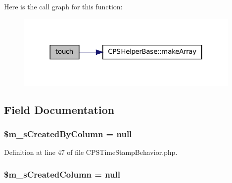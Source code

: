 Here is the call graph for this function:\nopagebreak
\begin{figure}[H]
\begin{center}
\leavevmode
\includegraphics[width=310pt]{classCPSTimeStampBehavior_aa5ac765fd764508a2e486e01a725b4a1_cgraph}
\end{center}
\end{figure}




\subsection{Field Documentation}
\hypertarget{classCPSTimeStampBehavior_a878fd48a0be875af51d1713e5c7406cd}{
\subsubsection[{\$m\_\-sCreatedByColumn}]{\setlength{\rightskip}{0pt plus 5cm}\$m\_\-sCreatedByColumn = null}}
\label{classCPSTimeStampBehavior_a878fd48a0be875af51d1713e5c7406cd}


Definition at line 47 of file CPSTimeStampBehavior.php.

\hypertarget{classCPSTimeStampBehavior_acb667183b5f36f920d81dd529029b1cb}{
\subsubsection[{\$m\_\-sCreatedColumn}]{\setlength{\rightskip}{0pt plus 5cm}\$m\_\-sCreatedColumn = null}}
\label{classCPSTimeStampBehavior_acb667183b5f36f920d81dd529029b1cb}


